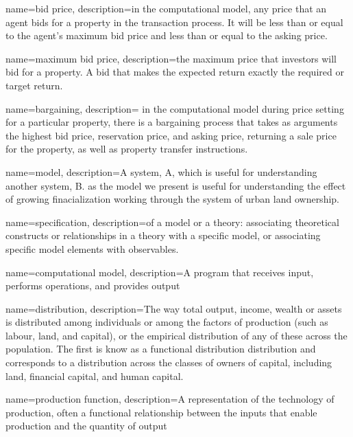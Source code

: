 {
name=bid price,
description={in  the computational model, any price that an agent bids for a property in the transaction process. It will be less than or equal to the agent's maximum bid price and less than or equal to the asking price.}
}

{
name=maximum bid price,
description={the maximum price that investors will bid for a property. A bid that makes the expected return exactly the required or  target return.}
}

{
name=bargaining,
description= {in the computational model during price setting for a particular property, there is a bargaining process that takes as arguments the highest bid price, reservation price, and asking price, returning a sale price for the property, as well as property transfer instructions.}
}


{
name=model,
description={A system, A, which is useful for understanding another system, B. as the model we present is useful for understanding the effect of growing finacialization working through the system of urban land ownership. }
}

{
name=specification,
description={of a model or a theory: associating theoretical constructs or relationships in a theory with a specific model, or associating specific model elements with observables. }
}

{
name=computational model,
description={A program that receives input, performs operations, and provides output}
}

{
name=distribution,
description={The way total output, income, wealth or assets is distributed among individuals or among the factors of production (such as labour, land, and capital), or the empirical distribution of any of these across the population. The first is know as a functional distribution distribution and  corresponds to a distribution across the classes of owners  of capital, including land, financial capital, and human capital. }
}

{
name=production function,
description={A representation of the technology of production, often a functional relationship between the inputs that enable production and the quantity of output}
}

